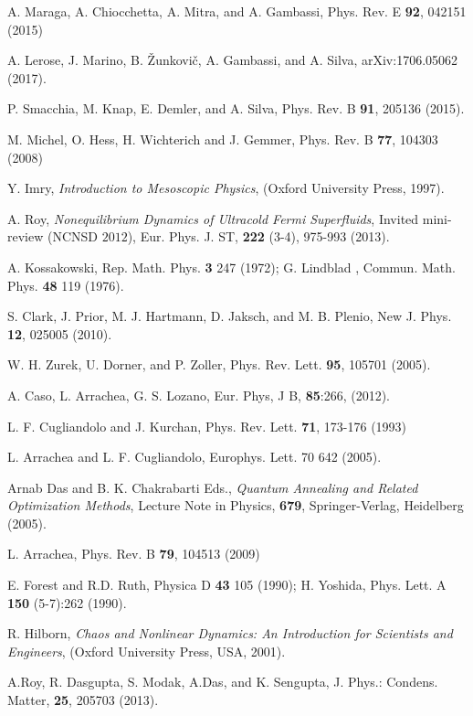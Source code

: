 \documentclass[a4paper,11pt,color]{article}
\renewenvironment{thebibliography}[1]{%
    \begin{oldthebibliography}{#1}%
      \setlength{\parskip}{0ex}%
      \setlength{\itemsep}{0ex}%
  }%
  {%
    \end{oldthebibliography}%
  }
\begin{document}
\begin{thebibliography}{}
A. Maraga, A. Chiocchetta, A. Mitra, and A. Gambassi, Phys. Rev. E {\bf 92}, 042151 (2015)

A. Lerose, J. Marino, B. {\v Z}unkovi{\v c}, A. Gambassi, and A. Silva, arXiv:1706.05062 (2017).

P. Smacchia, M. Knap, E. Demler, and A. Silva, Phys. Rev. B {\bf 91}, 205136 (2015).


M. Michel, O. Hess,  H. Wichterich and J. Gemmer, Phys. Rev. B {\bf 77}, 104303 (2008) 

Y. Imry, \textit{Introduction to Mesoscopic Physics}, (Oxford University Press, 1997).

A. Roy, \textit{Nonequilibrium Dynamics of Ultracold Fermi Superfluids}, Invited mini-review (NCNSD $2012$),
Eur. Phys. J. ST, {\bf 222} (3-4), 975-993 (2013).

A. Kossakowski, Rep. Math. Phys. {\bf 3} 247 (1972); G. Lindblad , Commun. Math. Phys. {\bf 48} 119 (1976).

S. Clark, J. Prior, M. J. Hartmann, D. Jaksch, and M. B. Plenio, New J. Phys. {\bf 12}, 025005 (2010).

W. H. Zurek, U. Dorner, and P. Zoller, Phys. Rev. Lett. {\bf 95}, 105701 (2005).

A. Caso, L. Arrachea, G. S. Lozano, Eur. Phys, J B, {\bf 85}:266, (2012).

L. F. Cugliandolo and J. Kurchan, Phys. Rev. Lett. {\bf 71}, 173-176 (1993) 

L. Arrachea and L. F. Cugliandolo, Europhys. Lett. 70 642 (2005).

Arnab Das and B. K. Chakrabarti Eds., \textit{Quantum Annealing and Related Optimization Methods}, Lecture Note in Physics, {\bf 679}, Springer-Verlag, Heidelberg (2005).

L. Arrachea, Phys. Rev. B {\bf 79}, 104513 (2009) 

E. Forest and R.D. Ruth, Physica D {\bf 43} 105 (1990); H. Yoshida, Phys. Lett. A {\bf 150} (5-7):262 (1990).

R. Hilborn, \textit{Chaos and Nonlinear Dynamics: An Introduction for Scientists and Engineers}, (Oxford University Press, USA, 2001).

A.Roy, R. Dasgupta, S. Modak, A.Das, and K. Sengupta,  J. Phys.: Condens. Matter, {\bf 25}, 205703 (2013).


\end{thebibliography}
\end{document}
